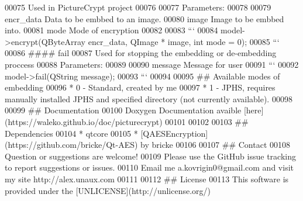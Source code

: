 \begin{DoxyCode}
00075 Used in PictureCrypt project
00076 
00077 Parameters:
00078 
00079 encr\_data  Data to be embbed to an image.
00080 image  Image to be embbed into.
00081 mode   Mode of encryption
00082 
00083 ```
00084 model->encrypt(QByteArray encr\_data, QImage * image, int mode = 0);
00085 ```
00086 #### fail
00087 Used for stopping the embedding or de-embedding proccess
00088 Parameters:
00089 
00090 message    Message for user
00091 ```
00092 model->fail(QString message);
00093 ```
00094 
00095 ## Available modes of embedding
00096 * 0 - Standard, created by me
00097 * 1 - JPHS, requires manually installed JPHS and specified directory (not currently available).
00098 
00099 ## Documentation
00100 Doxygen Documentation avaible [here](https://waleko.github.io/doc/picturecrypt)
00101 
00102 
00103 ## Dependencies
00104 * qtcore
00105 * [QAESEncryption](https://github.com/bricke/Qt-AES) by bricke
00106 
00107 ## Contact
00108 Question or suggestions are welcome!
00109 Please use the GitHub issue tracking to report suggestions or issues.
00110 Email me a.kovrigin0@gmail.com and visit my site http://alex.unaux.com
00111 
00112 ## License
00113 This software is provided under the [UNLICENSE](http://unlicense.org/)
\end{DoxyCode}
